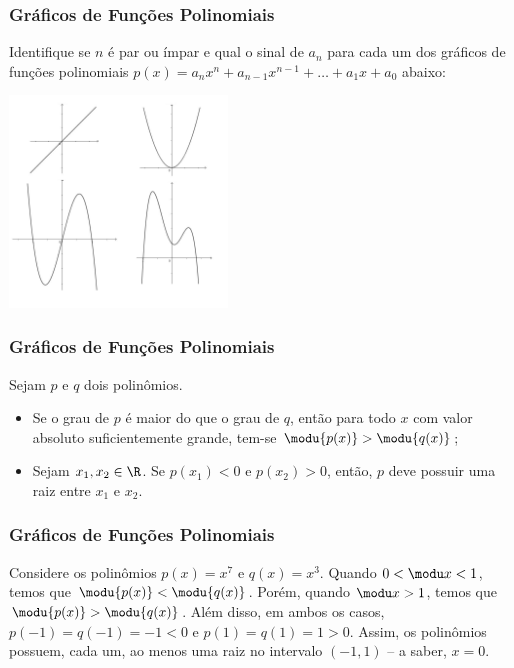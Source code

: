 \documentclass[10pt]{beamer}
\begin{document}
\begin{frame}
\frametitle{Gráficos de Funções Polinomiais} 
\begin{exemplo}
Identifique se $n$ é par ou ímpar e qual o sinal de $a_n$ para cada
um dos gráficos de funções polinomiais $p(x) = a_n x^n+ a_{n-1}
x^{n-1} + \dots + a_1x + a_0$ abaixo:

\begin{center}
\includegraphics[width=5.8cm]{figures/4graf.jpg}
\end{center}
\end{exemplo}

\end{frame}

\begin{frame}
\frametitle{Gráficos de Funções Polinomiais} 
 Sejam $p$ e $q$ dois polinômios.

\begin{itemize}
	\item Se o grau de $p$ é maior do
	que o grau de $q$, então para todo $x$ com valor absoluto
	suficientemente grande, tem-se $\modu {p(x)} > \modu{q(x)}$;
	\pause
	\item Sejam $x_1, x_2 \in \R$. Se $p(x_1) < 0$ e $p(x_2)>0$,
	então,
	$p$ deve possuir uma raiz entre $x_1$ e $x_2$.
\end{itemize}

\end{frame}

\begin{frame}
\frametitle{Gráficos de Funções Polinomiais} 
\begin{exemplo}\label{exemfig}
Considere os polinômios $p(x) = x^7 $ e $q(x)=x^3$. Quando $0< \modu
x < 1$, temos que $\modu {p(x)} < \modu{q(x)}$. Porém, quando $
\modu x > 1$, temos que $\modu {p(x)} > \modu{q(x)}$. Além disso, em
ambos os casos, $p(-1) = q(-1) = -1 <0$ e $p(1) = q(1) = 1 >0$.
Assim, os polinômios possuem, cada um, ao menos uma raiz no
intervalo $(-1, 1)$ -- a saber, $x=0$.

\end{exemplo}

\end{frame}
\end{document}
